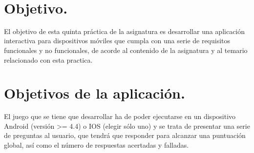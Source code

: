 \documentclass[10pt]{article}
\begin{document}
\begin{center}
\begin{minipage}{0.46\textwidth}
\begin{flushleft}
\end{flushleft}																		%
\end{minipage}		
\begin{minipage}{0.52\textwidth}		
\vspace{-0.6cm}											%
\begin{flushright} \large															%
\end{flushright}																	%
\end{minipage}	
\vspace*{1cm}
 	
 		\\																		%
\vspace{2cm} 																				
\begin{center}																					
 			\end{center}												  						
\end{center}							 											
																					
\newpage																		

\tableofcontents 

\newpage

\section{Objetivo.}



El objetivo de esta quinta práctica de la asignatura es desarrollar una aplicación interactiva para dispositivos móviles que cumpla con una serie de requisitos funcionales y no funcionales, de acorde al contenido de la asignatura y al temario relacionado con esta practica.



\section{Objetivos de la aplicación.} 

El juego que se tiene que desarrollar ha de poder ejecutarse en un dispositivo Android (versión >= 4.4) o IOS (elegir sólo uno) y se trata de presentar una serie de preguntas al usuario, que tendrá que responder para alcanzar una puntuación global, así como el número de respuestas acertadas y falladas. \\
\end{document}

